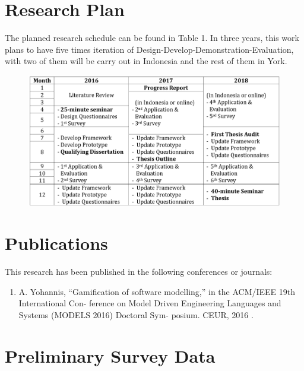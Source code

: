 \documentclass[12pt, a4paper]{report}
\begin{document}
\begin{appendices}

\chapter{Research Plan}
The planned research schedule can be found in Table 1. In three years, this work plans to have five times iteration of Design-Develop-Demonstration-Evaluation, with two of them will be carry out in Indonesia and the rest of them in York.

\begin {table}[ht]
\caption {Research Timetable} 
\end{table}
\begin{figure}[ht]
\centering
\includegraphics[width=\textwidth]{timetable}
\end{figure}

\chapter{Publications}
This research has been published in the following conferences or journals: 
\begin{enumerate}
  \item  A. Yohannis, “Gamiﬁcation of software modelling,” in the ACM/IEEE 19th International Con-
ference on Model Driven Engineering Languages and Systems (MODELS 2016) Doctoral Sym-
posium. CEUR, 2016 \cite{Yohannis2016}.
\end{enumerate}

\chapter{Preliminary Survey Data}
\label{chap:Preliminary Survey Data}


\end{appendices}
\end{document}
